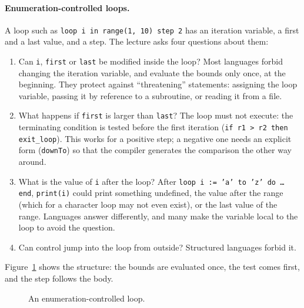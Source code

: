 \paragraph{Enumeration-controlled loops.} A loop such as
\texttt{loop i in range(1, 10) step 2} has an iteration variable, a first and
a last value, and a step. The lecture asks four questions about them:
\begin{enumerate}
  \item Can \texttt{i}, \texttt{first} or \texttt{last} be modified inside the loop?
    Most languages forbid changing the iteration variable, and evaluate the
    bounds only once, at the beginning. They protect against ``threatening''
    statements: assigning the loop variable, passing it by reference to a
    subroutine, or reading it from a file.
  \item What happens if \texttt{first} is larger than \texttt{last}? The loop must
    not execute: the terminating condition is tested before the first
    iteration (\texttt{if r1 > r2 then exit\_loop}). This works for a positive
    step; a negative one needs an explicit form (\texttt{downTo}) so that the
    compiler generates the comparison the other way around.
  \item What is the value of \texttt{i} after the loop? After
    \texttt{loop i := 'a' to 'z' do \dots{} end}, \texttt{print(i)} could print
    something undefined, the value after the range (which for a character
    loop may not even exist), or the last value of the range. Languages answer
    differently, and many make the variable local to the loop to avoid the
    question.
  \item Can control jump into the loop from outside? Structured languages forbid
    it.
\end{enumerate}
Figure~\ref{fig:enum-loop} shows the structure: the bounds are evaluated once,
the test comes first, and the step follows the body.

\begin{figure}[h]
\centering
{}
\caption{An enumeration-controlled loop.}
\label{fig:enum-loop}
\end{figure}

